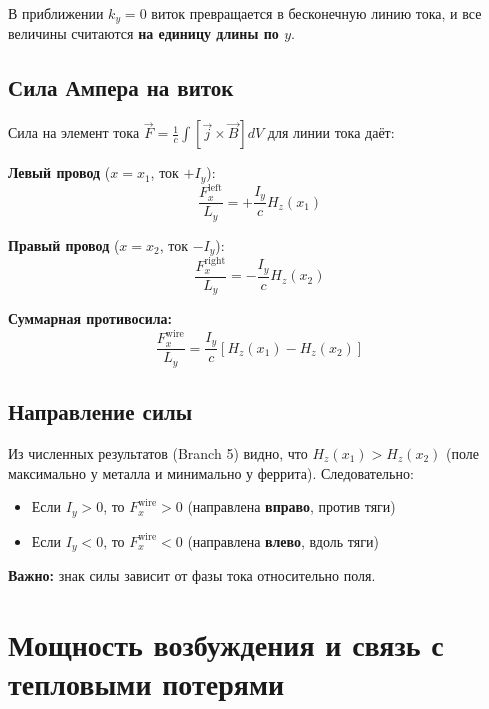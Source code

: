 \documentclass[a4paper,12pt]{article}
\begin{document}
В приближении $k_y = 0$ виток превращается в бесконечную линию тока, и все
величины считаются \textbf{на единицу длины по $y$}.

\subsection{Сила Ампера на виток}

Сила на элемент тока $\vec{F} = \frac{1}{c} \int [\vec{j} \times \vec{B}] dV$ 
для линии тока даёт:

\textbf{Левый провод} ($x = x_1$, ток $+I_y$):
\begin{equation}
\frac{F_x^{\text{left}}}{L_y} = +\frac{I_y}{c} H_z(x_1)
\label{eq:wire_left}
\end{equation}

\textbf{Правый провод} ($x = x_2$, ток $-I_y$):
\begin{equation}
\frac{F_x^{\text{right}}}{L_y} = -\frac{I_y}{c} H_z(x_2)
\label{eq:wire_right}
\end{equation}

\textbf{Суммарная противосила:}
\begin{equation}
\boxed{
\frac{F_x^{\text{wire}}}{L_y} = \frac{I_y}{c} \left[ H_z(x_1) - H_z(x_2) \right]
}
\label{eq:wire_force}
\end{equation}

\subsection{Направление силы}

Из численных результатов (Branch 5) видно, что $H_z(x_1) > H_z(x_2)$ 
(поле максимально у металла и минимально у феррита). Следовательно:

\begin{itemize}
    \item Если $I_y > 0$, то $F_x^{\text{wire}} > 0$ (направлена \textbf{вправо},
    против тяги)
    \item Если $I_y < 0$, то $F_x^{\text{wire}} < 0$ (направлена \textbf{влево},
    вдоль тяги)
\end{itemize}

\textbf{Важно:} знак силы зависит от фазы тока относительно поля.

\section{Мощность возбуждения и связь с тепловыми потерями}
\end{document}
